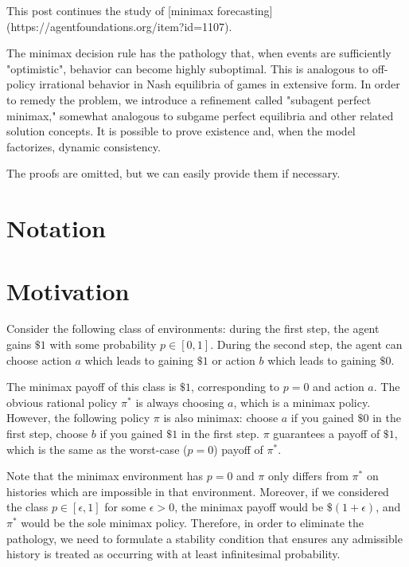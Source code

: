 \documentclass[a4paper]{article}
\newcommand{\Reals}{\mathbb{R}}
\begin{document}
This post continues the study of [minimax forecasting](https://agentfoundations.org/item?id=1107).

The minimax decision rule has the pathology that, when events are sufficiently "optimistic", behavior can become highly suboptimal. This is analogous to off-policy irrational behavior in Nash equilibria of games in extensive form. In order to remedy the problem, we introduce a refinement called "subagent perfect minimax," somewhat analogous to subgame perfect equilibria and other related solution concepts. It is possible to prove existence and, when the model factorizes, dynamic consistency.

The proofs are omitted, but we can easily provide them if necessary.

\section{Notation}


\section{Motivation}

Consider the following class of environments: during the first step, the agent gains $\$1$ with some probability $p \in [0,1]$. During the second step, the agent can choose action $a$ which leads to gaining $\$1$ or action $b$ which leads to gaining $\$0$. 

The minimax payoff of this class is $\$1$, corresponding to $p=0$ and action $a$. The obvious rational policy $\pi^*$ is always choosing $a$, which is a minimax policy. However, the following policy $\pi$ is also minimax: choose $a$ if you gained $\$0$ in the first step, choose $b$ if you gained $\$1$ in the first step. $\pi$ guarantees a payoff of $\$1$, which is the same as the worst-case ($p=0$) payoff of $\pi^*$.

Note that the minimax environment has $p=0$ and $\pi$ only differs from $\pi^*$ on histories which are impossible in that environment. Moreover, if we considered the class $p \in [\epsilon,1]$ for some $\epsilon > 0$, the minimax payoff would be $\$(1+\epsilon)$, and $\pi^*$ would be the sole minimax policy. Therefore, in order to eliminate the pathology, we need to formulate a stability condition that ensures any admissible history is treated as occurring with at least infinitesimal probability.
\end{document}
